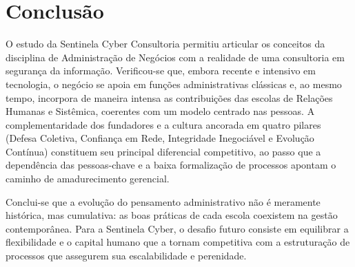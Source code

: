 \documentclass[12pt,a4paper]{article}
\begin{document}
\section{Conclusão}

O estudo da Sentinela Cyber Consultoria permitiu articular os conceitos da
disciplina de Administração de Negócios com a realidade de uma consultoria em
segurança da informação. Verificou-se que, embora recente e intensivo em
tecnologia, o negócio se apoia em funções administrativas clássicas e, ao mesmo
tempo, incorpora de maneira intensa as contribuições das escolas de Relações
Humanas e Sistêmica, coerentes com um modelo centrado nas pessoas. A
complementaridade dos fundadores e a cultura ancorada em quatro pilares (Defesa
Coletiva, Confiança em Rede, Integridade Inegociável e Evolução Contínua)
constituem seu principal diferencial competitivo, ao passo que a dependência
das pessoas-chave e a baixa formalização de processos apontam o caminho de
amadurecimento gerencial.

Conclui-se que a evolução do pensamento administrativo não é meramente
histórica, mas cumulativa: as boas práticas de cada escola coexistem na gestão
contemporânea. Para a Sentinela Cyber, o desafio futuro consiste em equilibrar a
flexibilidade e o capital humano que a tornam competitiva com a estruturação de
processos que assegurem sua escalabilidade e perenidade.
\end{document}

